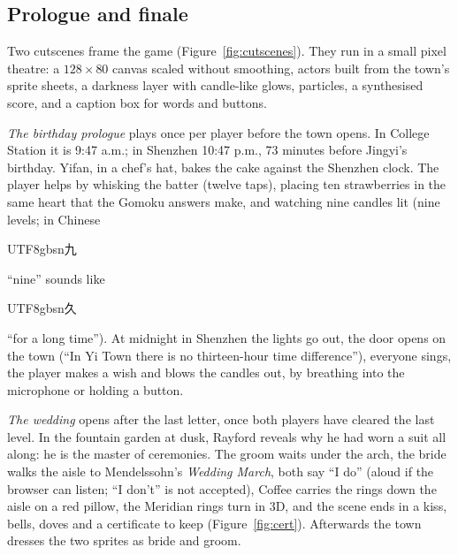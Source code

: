 \documentclass[sigconf,nonacm]{acmart}
\newcommand{\zh}[1]{\begin{CJK*}{UTF8}{gbsn}#1\end{CJK*}}
\begin{document}
\subsection{Prologue and finale}
Two cutscenes frame the game (Figure~\ref{fig:cutscenes}). They run in a small pixel theatre: a
$128\times80$ canvas scaled without smoothing, actors built from the town's sprite sheets, a
darkness layer with candle-like glows, particles, a synthesised score, and a caption box for words
and buttons.

\emph{The birthday prologue} plays once per player before the town opens. In College Station it is
9:47 a.m.; in Shenzhen 10:47 p.m., 73 minutes before Jingyi's birthday. Yifan, in a chef's hat,
bakes the cake against the Shenzhen clock. The player helps by whisking the batter (twelve taps),
placing ten strawberries in the same heart that the Gomoku answers make, and watching nine candles
lit (nine levels; in Chinese \zh{九} ``nine'' sounds like \zh{久} ``for a long time''). At midnight in
Shenzhen the lights go out, the door opens on the town (``In Yi Town there is no thirteen-hour
time difference''), everyone sings, the player makes a wish and blows the candles out, by
breathing into the microphone or holding a button.

\emph{The wedding} opens after the last letter, once both players have cleared the last level.
In the fountain garden at dusk, Rayford reveals why he had worn a suit all along: he is the
master of ceremonies. The groom waits under the arch, the bride walks the aisle to Mendelssohn's
\emph{Wedding March}, both say ``I do'' (aloud if the browser can listen; ``I don't'' is not
accepted), Coffee carries the rings down the aisle on a red pillow, the Meridian rings turn in
3D, and the scene ends in a kiss, bells, doves and a certificate to keep
(Figure~\ref{fig:cert}). Afterwards the town dresses the two sprites as bride and groom.
\end{document}
